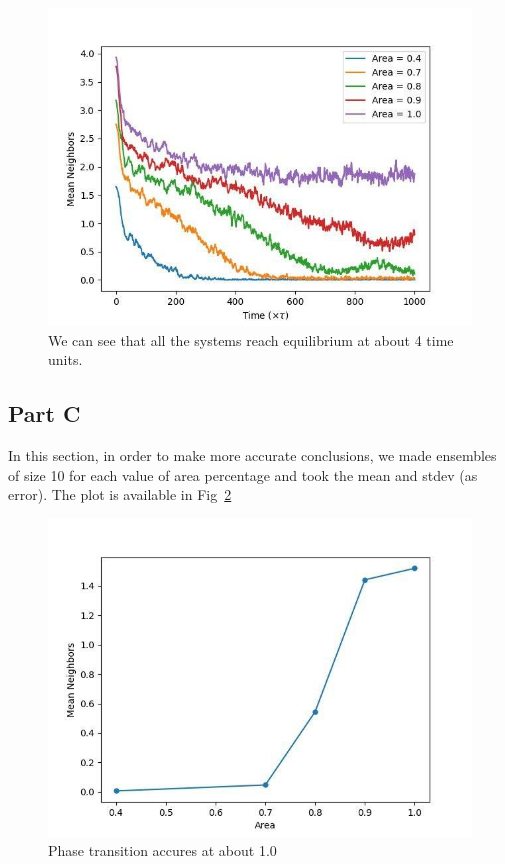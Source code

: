 \documentclass[12pt, a4paper]{article}
\begin{document}
	\begin{figure}[h!]
		\centering
		\includegraphics[width=.8\linewidth]{../p3/results/mean_neighbors.jpg}
		\caption{We can see that all the systems reach equilibrium at about 4 time units.}
		\label{fig:mean_neighbors}
	\end{figure}
	
	\subsection{Part C}
	In this section, in order to make more accurate conclusions, we made ensembles of size 10 for each value of area percentage and took the mean
	and stdev (as error). The plot is available in Fig~\ref{fig:eq_mean_neighbors}
	
	\begin{figure}[h!]
		\centering
		\includegraphics[width=.8\linewidth]{../p3/results/eq_mean_neighbors.jpg}
		\caption{Phase transition accures at about 1.0	}
		\label{fig:eq_mean_neighbors}
	\end{figure}
\end{document}
